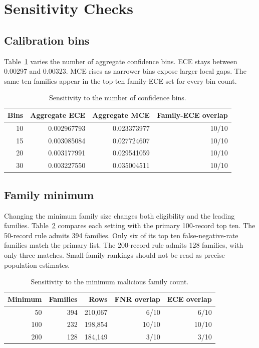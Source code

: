 \documentclass[11pt]{article}
\begin{document}
\section{Sensitivity Checks}

\subsection{Calibration bins}

Table~\ref{tab:bins} varies the number of aggregate confidence bins. ECE stays
between 0.00297 and 0.00323. MCE rises as narrower bins expose larger local
gaps. The same ten families appear in the top-ten family-ECE set for every bin
count.

\begin{table}[!htbp]
\centering
\caption{Sensitivity to the number of confidence bins.}
\label{tab:bins}
\begin{tabular}{rrrr}
\toprule
Bins & Aggregate ECE & Aggregate MCE & Family-ECE overlap \\
\midrule
10 & 0.002967793 & 0.023373977 & 10/10 \\
15 & 0.003085084 & 0.027724607 & 10/10 \\
20 & 0.003177991 & 0.029541059 & 10/10 \\
30 & 0.003227550 & 0.035004511 & 10/10 \\
\bottomrule
\end{tabular}
\end{table}

\subsection{Family minimum}

Changing the minimum family size changes both eligibility and the leading
families. Table~\ref{tab:minimum} compares each setting with the primary
100-record top ten. The 50-record rule admits 394 families. Only six of its top
ten false-negative-rate families match the primary list. The 200-record rule
admits 128 families, with only three matches. Small-family rankings should not
be read as precise population estimates.

\begin{table}[!htbp]
\centering
\caption{Sensitivity to the minimum malicious family count.}
\label{tab:minimum}
\begin{tabular}{rrrrr}
\toprule
Minimum & Families & Rows & FNR overlap & ECE overlap \\
\midrule
50 & 394 & 210,067 & 6/10 & 6/10 \\
100 & 232 & 198,854 & 10/10 & 10/10 \\
200 & 128 & 184,149 & 3/10 & 3/10 \\
\bottomrule
\end{tabular}
\end{table}
\end{document}

